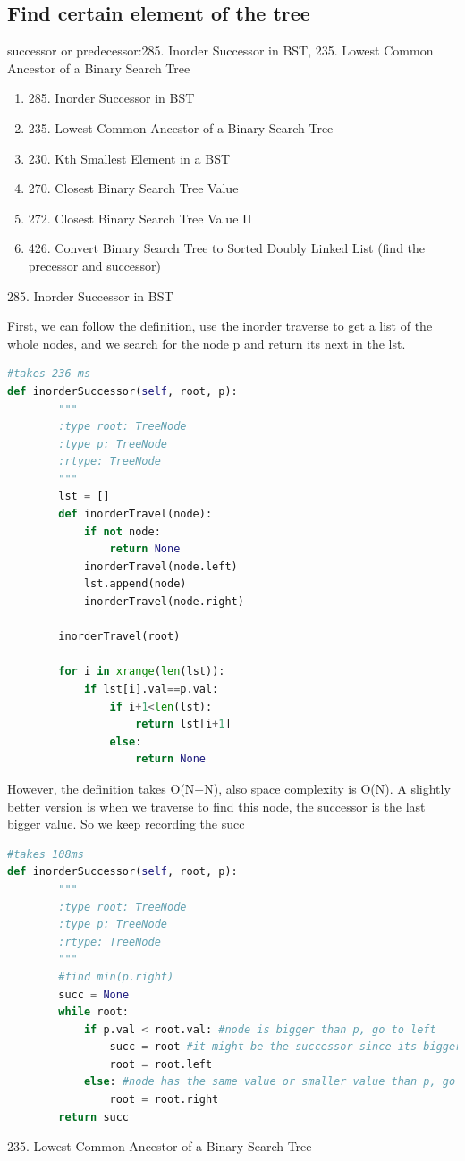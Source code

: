 \documentclass[../main.tex]{subfiles}
\begin{document}
\subsection{Find certain element of the tree}
successor or predecessor:285. Inorder Successor in BST, 235. Lowest Common Ancestor of a Binary Search Tree
\begin{enumerate} 
    \item 285. Inorder Successor in BST
    \item 235. Lowest Common Ancestor of a Binary Search Tree 
    \item 230. Kth Smallest Element in a BST
    \item 270. Closest Binary Search Tree Value
    \item 272. Closest Binary Search Tree Value II
    \item 426. Convert Binary Search Tree to Sorted Doubly Linked List (find the precessor and successor)
\end{enumerate}
285. Inorder Successor in BST

First, we can follow the definition, use the inorder traverse to get a list of the whole nodes, and we search for the node p and return its next in the lst.
\begin{lstlisting}[language = Python]
#takes 236 ms
def inorderSuccessor(self, root, p):
        """
        :type root: TreeNode
        :type p: TreeNode
        :rtype: TreeNode
        """
        lst = []
        def inorderTravel(node):
            if not node:
                return None
            inorderTravel(node.left)
            lst.append(node)
            inorderTravel(node.right)

        inorderTravel(root)
        
        for i in xrange(len(lst)):
            if lst[i].val==p.val:
                if i+1<len(lst):
                    return lst[i+1]
                else:
                    return None
\end{lstlisting}

However, the definition takes O(N+N), also space complexity is O(N). A slightly better version is when we traverse to find this node, the successor is the last bigger value. So we keep recording the succ
\begin{lstlisting}[language = Python]
#takes 108ms
def inorderSuccessor(self, root, p):
        """
        :type root: TreeNode
        :type p: TreeNode
        :rtype: TreeNode
        """
        #find min(p.right)
        succ = None
        while root:
            if p.val < root.val: #node is bigger than p, go to left
                succ = root #it might be the successor since its bigger
                root = root.left
            else: #node has the same value or smaller value than p, go to right
                root = root.right
        return succ
\end{lstlisting}
235. Lowest Common Ancestor of a Binary Search Tree
\end{document}
